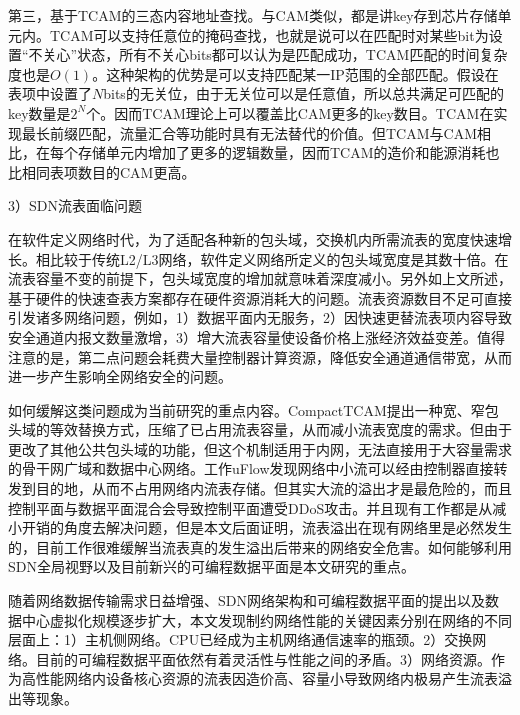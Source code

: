 第三，基于TCAM的三态内容地址查找。与CAM类似，都是讲key存到芯片存储单元内。TCAM可以支持任意位的掩码查找，也就是说可以在匹配时对某些bit为设置“不关心”状态，所有不关心bits都可以认为是匹配成功，TCAM匹配的时间复杂度也是$O(1)$。这种架构的优势是可以支持匹配某一IP范围的全部匹配。假设在表项中设置了$N$bits的无关位，由于无关位可以是任意值，所以总共满足可匹配的key数量是$2^{N}$个。因而TCAM理论上可以覆盖比CAM更多的key数目。TCAM在实现最长前缀匹配，流量汇合等功能时具有无法替代的价值。但TCAM与CAM相比，在每个存储单元内增加了更多的逻辑数量，因而TCAM的造价和能源消耗也比相同表项数目的CAM更高。


3）SDN流表面临问题

在软件定义网络时代，为了适配各种新的包头域，交换机内所需流表的宽度快速增长。相比较于传统L2/L3网络，软件定义网络所定义的包头域宽度是其数十倍。在流表容量不变的前提下，包头域宽度的增加就意味着深度减小。另外如上文所述，基于硬件的快速查表方案都存在硬件资源消耗大的问题。流表资源数目不足可直接引发诸多网络问题，例如，1）数据平面内无服务，2）因快速更替流表项内容导致安全通道内报文数量激增，3）增大流表容量使设备价格上涨经济效益变差。值得注意的是，第二点问题会耗费大量控制器计算资源，降低安全通道通信带宽，从而进一步产生影响全网络安全的问题。

如何缓解这类问题成为当前研究的重点内容。CompactTCAM提出一种宽、窄包头域的等效替换方式，压缩了已占用流表容量，从而减小流表宽度的需求。但由于更改了其他公共包头域的功能，但这个机制适用于内网，无法直接用于大容量需求的骨干网广域和数据中心网络。工作uFlow发现网络中小流可以经由控制器直接转发到目的地，从而不占用网络内流表存储。但其实大流的溢出才是最危险的，而且控制平面与数据平面混合会导致控制平面遭受DDoS攻击。并且现有工作都是从减小开销的角度去解决问题，但是本文后面证明，流表溢出在现有网络里是必然发生的，目前工作很难缓解当流表真的发生溢出后带来的网络安全危害。如何能够利用SDN全局视野以及目前新兴的可编程数据平面是本文研究的重点。








随着网络数据传输需求日益增强、SDN网络架构和可编程数据平面的提出以及数据中心虚拟化规模逐步扩大，本文发现制约网络性能的关键因素分别在网络的不同层面上：1）主机侧网络。CPU已经成为主机网络通信速率的瓶颈。2）交换网络。目前的可编程数据平面依然有着灵活性与性能之间的矛盾。3）网络资源。作为高性能网络内设备核心资源的流表因造价高、容量小导致网络内极易产生流表溢出等现象。

